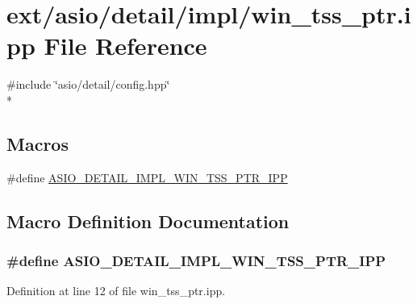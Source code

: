 \hypertarget{win__tss__ptr_8ipp}{}\section{ext/asio/detail/impl/win\+\_\+tss\+\_\+ptr.ipp File Reference}
\label{win__tss__ptr_8ipp}
{\ttfamily \#include \char`\"{}asio/detail/config.\+hpp\char`\"{}}\\*
\subsection*{Macros}
\begin{DoxyCompactItemize}
\item 
\#define \hyperlink{win__tss__ptr_8ipp_a6480bae9afb9ee415469707b67ba9a26}{A\+S\+I\+O\+\_\+\+D\+E\+T\+A\+I\+L\+\_\+\+I\+M\+P\+L\+\_\+\+W\+I\+N\+\_\+\+T\+S\+S\+\_\+\+P\+T\+R\+\_\+\+I\+P\+P}
\end{DoxyCompactItemize}


\subsection{Macro Definition Documentation}
\hypertarget{win__tss__ptr_8ipp_a6480bae9afb9ee415469707b67ba9a26}{}
\subsubsection[{A\+S\+I\+O\+\_\+\+D\+E\+T\+A\+I\+L\+\_\+\+I\+M\+P\+L\+\_\+\+W\+I\+N\+\_\+\+T\+S\+S\+\_\+\+P\+T\+R\+\_\+\+I\+P\+P}]{\setlength{\rightskip}{0pt plus 5cm}\#define A\+S\+I\+O\+\_\+\+D\+E\+T\+A\+I\+L\+\_\+\+I\+M\+P\+L\+\_\+\+W\+I\+N\+\_\+\+T\+S\+S\+\_\+\+P\+T\+R\+\_\+\+I\+P\+P}\label{win__tss__ptr_8ipp_a6480bae9afb9ee415469707b67ba9a26}


Definition at line 12 of file win\+\_\+tss\+\_\+ptr.\+ipp.

